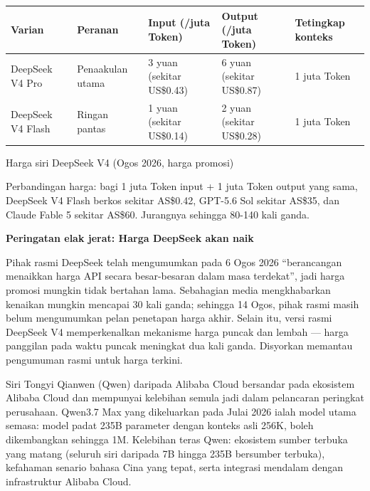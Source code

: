 \begin{center}
\begin{tabularx}{\linewidth}{|X|X|X|X|X|}
\hline
\textbf{Varian} & \textbf{Peranan} & \textbf{Input (/juta Token)} & \textbf{Output (/juta Token)} & \textbf{Tetingkap konteks} \tabularnewline
\hline
DeepSeek V4 Pro & Penaakulan utama & 3 yuan (sekitar US\$0.43) & 6 yuan (sekitar US\$0.87) & 1 juta Token \tabularnewline
DeepSeek V4 Flash & Ringan pantas & 1 yuan (sekitar US\$0.14) & 2 yuan (sekitar US\$0.28) & 1 juta Token \tabularnewline
\hline
\end{tabularx}
\end{center}

\begin{center}\small\color{gray}Harga siri DeepSeek V4 (Ogos 2026, harga promosi)\end{center}

Perbandingan harga: bagi 1 juta Token input + 1 juta Token output yang sama, DeepSeek V4 Flash berkos sekitar AS\$0.42, GPT-5.6 Sol sekitar AS\$35, dan Claude Fable 5 sekitar AS\$60. Jurangnya sehingga 80-140 kali ganda.

\textbf{Peringatan elak jerat: Harga DeepSeek akan naik}\par

Pihak rasmi DeepSeek telah mengumumkan pada 6 Ogos 2026 “berancangan menaikkan harga API secara besar-besaran dalam masa terdekat”, jadi harga promosi mungkin tidak bertahan lama. Sebahagian media mengkhabarkan kenaikan mungkin mencapai 30 kali ganda; sehingga 14 Ogos, pihak rasmi masih belum mengumumkan pelan penetapan harga akhir. Selain itu, versi rasmi DeepSeek V4 memperkenalkan mekanisme harga puncak dan lembah — harga panggilan pada waktu puncak meningkat dua kali ganda. Disyorkan memantau pengumuman rasmi untuk harga terkini.


Siri Tongyi Qianwen (Qwen) daripada Alibaba Cloud bersandar pada ekosistem Alibaba Cloud dan mempunyai kelebihan semula jadi dalam pelancaran peringkat perusahaan. Qwen3.7 Max yang dikeluarkan pada Julai 2026 ialah model utama semasa: model padat 235B parameter dengan konteks asli 256K, boleh dikembangkan sehingga 1M. Kelebihan teras Qwen: ekosistem sumber terbuka yang matang (seluruh siri daripada 7B hingga 235B bersumber terbuka), kefahaman senario bahasa Cina yang tepat, serta integrasi mendalam dengan infrastruktur Alibaba Cloud.

